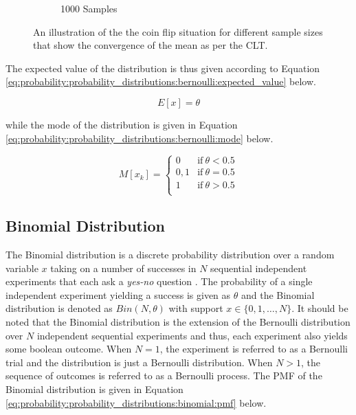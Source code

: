 \begin{figure}[htbp]
\begin{subfigure}{0.49\textwidth}
        \caption{1000 Samples}
        \label{fig:probability:probability_distributions:bernoulli:coin_1000}
    \end{subfigure}
    \par\bigskip
    \caption{An illustration of the the coin flip situation for different sample sizes that show the convergence of the mean as per the \ac{CLT}.}
    \label{fig:probability:probability_distributions:bernoulli:coin}
\end{figure}

The expected value of the distribution is thus given according to Equation \ref{eq:probability:probability_distributions:bernoulli:expected_value} below.

\begin{equation}
    \label{eq:probability:probability_distributions:bernoulli:expected_value}
    E[x] = \theta
\end{equation}

while the mode of the distribution is given in Equation \ref{eq:probability:probability_distributions:bernoulli:mode} below.

\begin{equation}
    \label{eq:probability:probability_distributions:bernoulli:mode}
    M[x_{k}] = 
    \begin{cases}
    	0 & \text{if}\ \theta < 0.5 \\
        	0,1 & \text{if}\ \theta = 0.5 \\
        	1 & \text{if}\ \theta > 0.5 \\
    \end{cases}
\end{equation}




\subsection{Binomial Distribution}
\label{sec:probability:probability_distributions:bin}


The Binomial distribution is a discrete probability distribution over a random variable $x$ taking on a number of successes in $N$ sequential independent experiments that each ask a \textit{yes-no} question \cite{ref:wackerly:2014}. The probability of a single independent experiment yielding a success is given as $\theta$ and the Binomial distribution is denoted as $Bin(N, \theta)$ with support $x \in \{0, 1, \dots, N\}$.  It should be noted that the Binomial distribution is the extension of the Bernoulli distribution over $N$ independent sequential experiments and thus, each experiment also yields some boolean outcome. When $N=1$, the experiment is referred to as a Bernoulli trial and the distribution is just a Bernoulli distribution. When $N > 1$, the sequence of outcomes is referred to as a Bernoulli process. The \ac{PMF} of the Binomial distribution is given in Equation \ref{eq:probability:probability_distributions:binomial:pmf} below.


